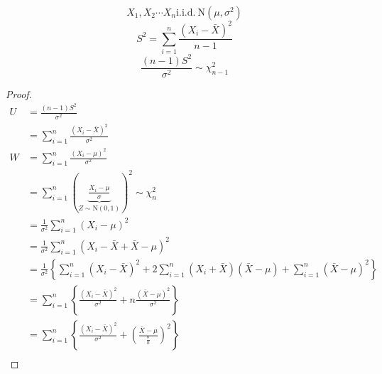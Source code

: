 \documentclass{article}
\let\ddd\cdots
\theoremstyle{definition}
\theoremstyle{remark}
\theoremstyle{example}
\begin{document}
	\[ X_1,X_2 \ddd X_n \mathrm{i.i.d.\ N}(\mu,\sigma^2) \]
	\[S^2=\sum_{i=1}^n \frac{(X_i-\bar{X} )^2}{n-1} \]
	\[\frac{(n-1)S^2}{\sigma^2} \sim \chi_{n-1}^2 \]
	\begin{proof}
		\begin{align*}
			U&=\frac{(n-1)S^2}{\sigma^2}\\
			&=\sum_{i=1}^{n}\frac{(X_i-\bar{X})^2}{\sigma^2}\\
			W&=\sum_{i=1}^n \frac{(X_i - \mu)^2}{\sigma^2}\\
			&= \sum_{i=1}^{n}\left(\underbrace{\frac{X_i-\mu}{\sigma}}_{Z \sim \mathrm{N}(0,1)}\right)^2 \sim \chi_n^2\\
			&= \frac{1}{\sigma^2} \sum_{i=1}^{n}(X_i - \mu )^2\\
			&=\frac{1}{\sigma^2}\sum_{i=1}^n(X_i-\bar{X}+\bar{X}-\mu)^2\\
			&=\frac{1}{\sigma^2}\left\{\sum_{i=1}^{n}(X_i-\bar{X})^2+2\sum_{i=1}^{n}(X_i+\bar{X})(\bar{X}- \mu) + \sum_{i=1}^{n}(\bar{X}-\mu)^2  \right\}\\
			&=\sum_{i=1}^{n}\left\{\frac{(X_i-\bar{X})^2}{\sigma^2}+n\frac{(\bar{X}-\mu)^2}{\sigma^2}  \right\}\\
			&=\sum_{i=1}^{n}\left\{\frac{(X_i-\bar{X})^2}{\sigma^2}+\left(\frac{\bar{X}-\mu}{\frac{\sigma}{n}}\right)^2  \right\}\\
		\end{align*}
	\end{proof}
\end{document}
